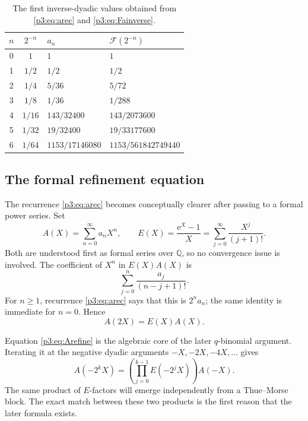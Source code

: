 \documentclass[11pt,oneside]{article}
\theoremstyle{definition}
\theoremstyle{remark}
\newcommand{\F}{\mathcal F}
\newcommand{\Q}{\mathbb Q}
\newcommand{\e}{\mathrm e}
\begin{document}
\begin{table}[H]
\centering
\caption{The first inverse-dyadic values obtained from \eqref{p3:eq:arec} and \eqref{p3:eq:Fainverse}.}
\label{p3:tab:firstvalues}
\begin{tabular}{@{}ccll@{}}
\toprule
$n$ & $2^{-n}$ & $a_n$ & $\F(2^{-n})$\\
\midrule
0 & $1$      & $1$                    & $1$\\
1 & $1/2$    & $1/2$                  & $1/2$\\
2 & $1/4$    & $5/36$                 & $5/72$\\
3 & $1/8$    & $1/36$                 & $1/288$\\
4 & $1/16$   & $143/32400$            & $143/2073600$\\
5 & $1/32$   & $19/32400$             & $19/33177600$\\
6 & $1/64$   & $1153/17146080$        & $1153/561842749440$\\
\bottomrule
\end{tabular}
\end{table}

\subsection{The formal refinement equation}

The recurrence \eqref{p3:eq:arec} becomes conceptually clearer after passing to a formal power series.  Set
\begin{equation}\label{p3:eq:Adef}
  A(X)=\sum_{n=0}^{\infty}a_nX^n,
  \qquad
  E(X)=\frac{\e^X-1}{X}
      =\sum_{j=0}^{\infty}\frac{X^j}{(j+1)!}.
\end{equation}
Both are understood first as formal series over $\Q$, so no convergence issue is involved.  The coefficient of $X^n$ in $E(X)A(X)$ is
\[
  \sum_{j=0}^{n}\frac{a_j}{(n-j+1)!}.
\]
For $n\ge1$, recurrence \eqref{p3:eq:arec} says that this is $2^na_n$; the same identity is immediate for $n=0$.  Hence
\begin{equation}\label{p3:eq:Arefine}
  \boxed{A(2X)=E(X)A(X).}
\end{equation}

Equation \eqref{p3:eq:Arefine} is the algebraic core of the later $q$-binomial argument.  Iterating it at the negative dyadic arguments $-X,-2X,-4X,\ldots$ gives
\begin{equation}\label{p3:eq:Aiterate}
 A(-2^kX)
  =\left(\prod_{j=0}^{k-1}E(-2^jX)\right)A(-X).
\end{equation}
The same product of $E$-factors will emerge independently from a Thue--Morse block.  The exact match between these two products is the first reason that the later formula exists.
\end{document}
